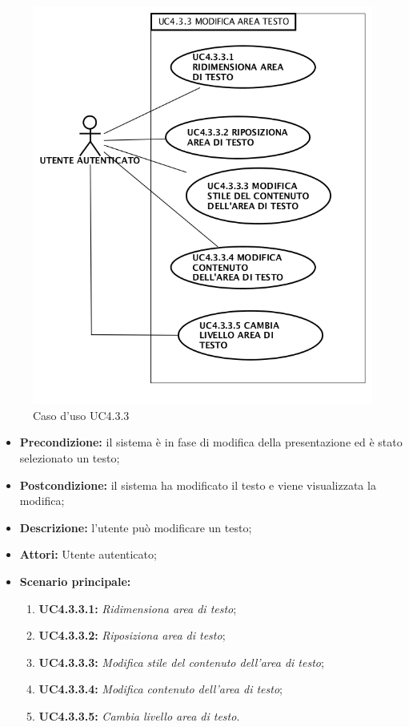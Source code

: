 \begin{figure}[h]
	\begin{center}
	\includegraphics[scale=0.4]{diagram/UC4-3-3.png}
	\caption{Caso d'uso UC4.3.3}
	\end{center}
\end{figure}
\begin{itemize}
	\item \textbf{Precondizione:} il sistema è in fase di modifica della presentazione ed è stato selezionato un testo;
	\item \textbf{Postcondizione:} il sistema ha modificato il testo e viene visualizzata la modifica;
	\item \textbf{Descrizione:} l'utente può modificare un testo;
	\item \textbf{Attori:} Utente autenticato;
	\item \textbf{Scenario principale:}
	\begin{enumerate}
		\item \textbf{ UC4.3.3.1:} \textit{ Ridimensiona area di testo};
		\item \textbf{ UC4.3.3.2:} \textit{ Riposiziona area di testo};
		\item \textbf{ UC4.3.3.3:} \textit{ Modifica stile del contenuto dell'area di testo};
		\item \textbf{ UC4.3.3.4:} \textit{ Modifica contenuto dell'area di testo};
		\item \textbf{ UC4.3.3.5:} \textit{ Cambia livello area di testo}.
	\end{enumerate}
\end{itemize}
